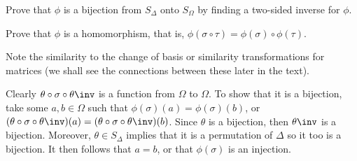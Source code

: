 \begin{problems}
\begin{problems}
        \item Prove that $\phi$ is a bijection from $S_\Delta$ onto $S_\Omega$ by finding a two-sided inverse for $\phi$.
        \item Prove that $\phi$ is a homomorphism, that is, $\phi(\sigma \circ \tau) = \phi(\sigma) \circ \phi(\tau)$.
    \end{problems}
    Note the similarity to the change of basis or similarity transformations for matrices (we shall see the connections between these later in the text).
    \begin{solalph}
        \item Clearly $\theta \circ \sigma \circ \theta\inv$ is a function from $\Omega$ to $\Omega$. To show that it is a bijection, take some $a, b \in \Omega$ such that $\phi(\sigma)(a) = \phi(\sigma)(b)$, or $(\theta\circ\sigma\circ\theta\inv)(a) = (\theta\circ\sigma\circ\theta\inv)(b)$. Since $\theta$ is a bijection, then $\theta\inv$ is a bijection. Moreover, $\theta \in S_\Delta$ implies that it is a permutation of $\Delta$ so it too is a bijection. It then follows that $a = b$, or that $\phi(\sigma)$ is an injection.
        

\end{solalph}
\end{problems}
